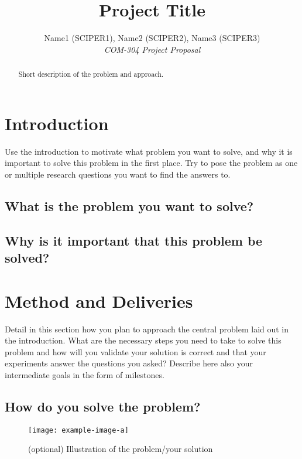\documentclass[10pt,conference,compsocconf]{IEEEtran}
\begin{document}
\title{Project Title}

\author{
  Name1 (SCIPER1), Name2 (SCIPER2), Name3 (SCIPER3)\\
  \textit{COM-304 Project Proposal}
}

\maketitle

\begin{abstract}
    Short description of the problem and approach.
\end{abstract}


\section{Introduction}
Use the introduction to motivate what problem you want to solve, and why it is important to solve this problem in the first place.
Try to pose the problem as one or multiple research questions you want to find the answers to.

\subsection{What is the problem you want to solve?}

\subsection{Why is it important that this problem be solved?}


\section{Method and Deliveries}
Detail in this section how you plan to approach the central problem laid out in the introduction.
What are the necessary steps you need to take to solve this problem and how will you validate your solution is correct and that your experiments answer the questions you asked?
Describe here also your intermediate goals in the form of milestones.

\subsection{How do you solve the problem?}
\begin{figure}[tbph]
  \centering
  \texttt{[image: example-image-a]}
  \caption{(optional) Illustration of the problem/your solution}
  \vspace{-3mm}
  \label{fig:placeholder1}
\end{figure}
\end{document}
